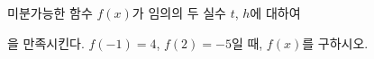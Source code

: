 미분가능한 함수 $f(x)$가 임의의 두 실수 $t$, $h$에 대하여 \par\smallskip{}\par\smallskip\noindent 을 만족시킨다. $f(-1)=4$, $f(2)=-5$일 때, $f(x)$를 구하시오. 
